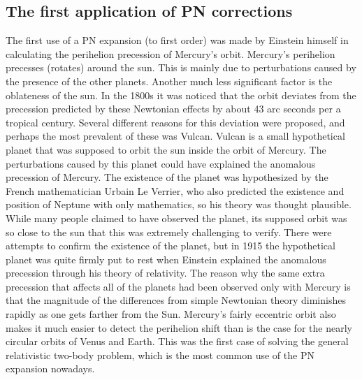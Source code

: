\documentclass[english, oneside]{HYgradu}
\begin{document}
\subsection{The first application of PN corrections}

The first use of a PN expansion (to first order) was made by Einstein himself in calculating the perihelion precession of Mercury's orbit.
Mercury's perihelion precesses (rotates) around the sun. This is mainly due to perturbations caused by the presence of the other planets. Another much less significant factor is the oblateness of the sun. In the 1800s it was noticed that the orbit deviates from the precession predicted by these Newtonian effects by about 43 arc seconds per a tropical century.
Several different reasons for this deviation were proposed, and perhaps the most prevalent of these was Vulcan. Vulcan is a small hypothetical planet that was supposed to orbit the sun inside the orbit of Mercury. The perturbations caused by this planet could have explained the anomalous precession of Mercury. The existence of the planet was hypothesized by the French mathematician Urbain Le Verrier, who also predicted the existence and position of Neptune with only mathematics, so his theory was thought plausible. While many people claimed to have observed the planet, its supposed orbit was so close to the sun that this was extremely challenging to verify.
There were attempts to confirm the existence of the planet, but in 1915 the hypothetical planet was quite firmly put to rest when Einstein explained the anomalous precession through his theory of relativity. The reason why the same extra precession that affects all of the planets had been observed only with Mercury is that the magnitude of the differences from simple Newtonian theory diminishes rapidly as one gets farther from the Sun. Mercury's fairly eccentric orbit also makes it much easier to detect the perihelion shift than is the case for the nearly circular orbits of Venus and Earth.
This was the first case of solving the general relativistic two-body problem, which is the most common use of the PN expansion nowadays. %


%
\end{document}
